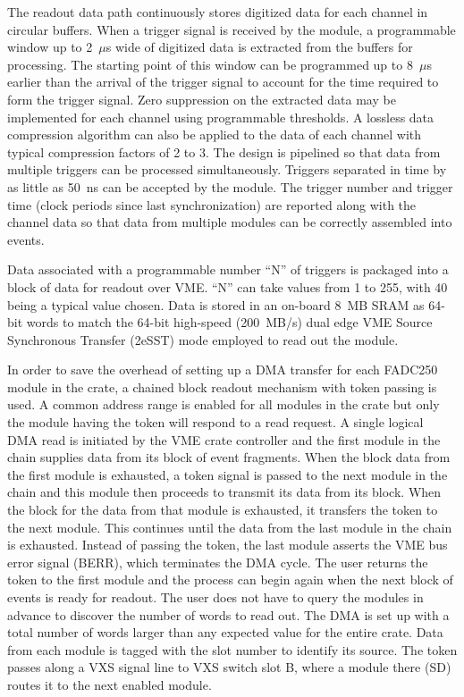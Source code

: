 The readout data path continuously stores digitized data for each channel in circular buffers. When a trigger signal is
received by the module, a programmable window up to 2~$\mu$s wide of digitized data is extracted from the buffers
for processing. The starting point of this window can be programmed up to 8~$\mu$s earlier than the arrival of the
trigger signal to account for the time required to form the trigger signal. Zero suppression on the extracted data may
be implemented for each channel using programmable thresholds. A lossless data compression algorithm can also be
applied to the data of each channel with typical compression factors of 2 to 3. The design is pipelined so that data from
multiple triggers can be processed simultaneously. Triggers separated in time by as little as 50~ns can be accepted by
the module. The trigger number and trigger time (clock periods since last synchronization) are reported along with the
channel data so that data from multiple modules can be correctly assembled into events. 

Data associated with a programmable number ``N'' of triggers is packaged into a block of data for readout over VME.
``N'' can take values from 1 to 255, with 40 being a typical value chosen.  Data is stored in an on-board 8~MB SRAM as
64-bit words to match the 64-bit high-speed (200~MB/s) dual edge VME Source Synchronous Transfer (2eSST) mode
employed to read out the module.  

In order to save the overhead of setting up a DMA transfer for each FADC250 module in the crate, a chained block
readout mechanism with token passing is used. A common address range is enabled for all modules in the crate but
only the module having the token will respond to a read request. A single logical DMA read is initiated by the VME crate
controller and the first module in the chain supplies data from its block of event fragments. When the block data from
the first module is exhausted, a token signal is passed to the next module in the chain and this module then proceeds to
transmit its data from its block. When the block for the data from that module is exhausted, it transfers the token to
the next module.  This continues until the data from the last module in the chain is exhausted. Instead of passing the
token, the last module asserts the VME bus error signal (BERR), which terminates the DMA cycle. The user returns the
token to the first module and the process can begin again when the next block of events is ready for readout. The user
does not have to query the modules in advance to discover the number of words to read out. The DMA is set up with a
total number of words larger than any expected value for the entire crate.  Data from each module is tagged with the
slot number to identify its source. The token passes along a VXS signal line to VXS switch slot B, where a module there
(SD) routes it to the next enabled module.

